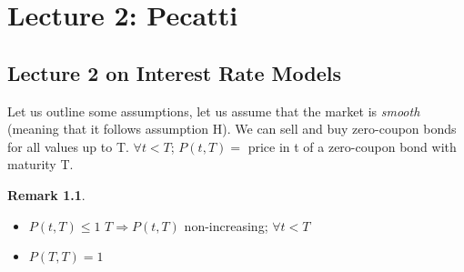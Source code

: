 \documentclass[10pt, oneside, reqno]{amsbook}
\theoremstyle{plain}%
\theoremstyle{definition}
\theoremstyle{rem}
\newtheorem*{rem}{Remark}
\theoremstyle{definition}
\newcommand{\lt}{<}
\numberwithin{equation}{chapter}
\begin{document}
\chapter{Lecture 2: Pecatti}
\section{Lecture 2 on Interest Rate Models}
Let us outline some assumptions, let us assume that the market is \textit{smooth} (meaning that it follows assumption
H). 
We can sell and buy zero-coupon bonds for all values up to T. 
$\forall t \lt T$; $P(t,T) = $ price in t of a zero-coupon bond with maturity T. 
\begin{rem}
 \begin{itemize}
  \item $P(t,T) \leq 1$ $T \Rightarrow P(t,T)$ non-increasing; $\forall t \lt T$
\item $P(T,T) = 1$
 \end{itemize}

\end{rem}
\end{document}
